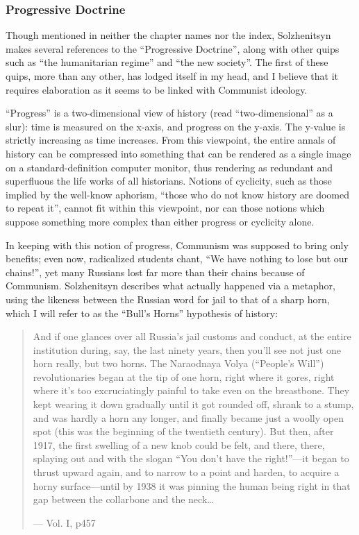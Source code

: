 \documentclass{article}
\begin{document}
\subsubsection{Progressive Doctrine}
Though mentioned in neither the chapter names nor the index, Solzhenitsyn makes several references to the ``Progressive Doctrine'', along with other quips such as ``the humanitarian regime'' and ``the new society''.  The first of these quips, more than any other, has lodged itself in my head, and I believe that it requires elaboration as it seems to be linked with Communist ideology.

``Progress'' is a two-dimensional view of history (read ``two-dimensional'' as a slur): time is measured on the x-axis, and progress on the y-axis.  The y-value is strictly increasing as time increases.  From this viewpoint, the entire annals of history can be compressed into something that can be rendered as a single image on a standard-definition computer monitor, thus rendering as redundant and superfluous the life works of all historians.  Notions of cyclicity, such as those implied by the well-know aphorism, ``those who do not know history are doomed to repeat it'', cannot fit within this viewpoint, nor can those notions which suppose something more complex than either progress or cyclicity alone.

In keeping with this notion of progress, Communism was supposed to bring only benefits; even now, radicalized students chant, ``We have nothing to lose but our chains!'', yet many Russians lost far more than their chains because of Communism.  Solzhenitsyn describes what actually happened via a metaphor, using the likeness between the Russian word for jail to that of a sharp horn, which I will refer to as the ``Bull's Horns'' hypothesis of history:

\begin{quote}
And if one glances over all Russia's jail customs and conduct, at the entire institution during, say, the last ninety years, then you'll see not just one horn really, but two horns.  The Naraodnaya Volya (``People's Will'') revolutionaries began at the tip of one horn, right where it gores, right where it's too excruciatingly painful to take even on the breastbone.  They kept wearing it down gradually until it got rounded off, shrank to a stump, and was hardly a horn any longer, and finally became just a woolly open spot (this was the beginning of the twentieth century).  But then, after 1917, the first swelling of a new knob could be felt, and there, there, splaying out and with the slogan ``You don't have the right!''---it began to thrust upward again, and to narrow to a point and harden, to acquire a horny surface---until by 1938 it was pinning the human being right in that gap between the collarbone and the neck\ldots

--- Vol. I, p457
\end{quote}
\end{document}
